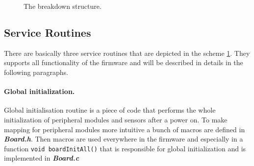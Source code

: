 \documentclass[a4paper,12pt]{article} %
\newcommand{\textitbf}[1]{\textbf{\textit{#1}}}
\newcommand{\inlinecode}[1]{\lstinline{#1}}
\begin{document}
\begin{figure}[H]
\caption{The breakdown structure.}
\label{ris:scheme}
\end{figure}

\subsection{Service Routines}
There are basically three service routines that are depicted in the scheme \ref{ris:scheme}. They supports all functionality of the firmware and will be described in details in the following paragraphs. 

\paragraph{Global initialization.}

Global initialisation routine is a piece of code that performs the whole initialization of peripheral modules and sensors after a power on. To make mapping for peripheral modules more intuitive a bunch of macros are defined in \textitbf{Board.h}. Then macros are used everywhere in the firmware and especially in a function \inlinecode{void boardInitAll()} that is responsible for global initialization and is implemented in \textitbf{Board.c}
\end{document}

